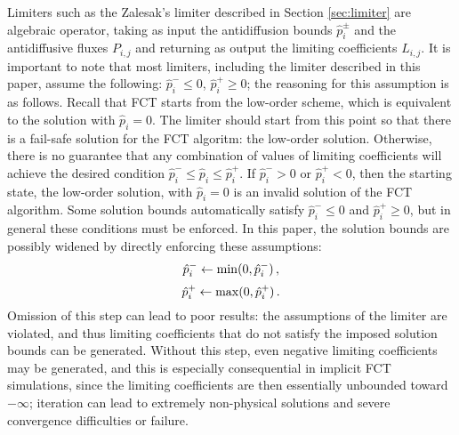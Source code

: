 Limiters such as the Zalesak's limiter described in Section \ref{sec:limiter} are algebraic
operator, taking as input the antidiffusion bounds
$\hat{p}_i^\pm$ and the antidiffusive fluxes $P_{i,j}$ and returning as output the
limiting coefficients $L_{i,j}$. It is important to note that most limiters,
including the limiter described in this paper, assume the following:
$\hat{p}_i^-\leq 0$, $\hat{p}_i^+\geq 0$; the reasoning for this assumption
is as follows. Recall that FCT starts from the
low-order scheme, which is equivalent to the solution with $\hat{p}_i=0$.
The limiter should start from this point so that there is a fail-safe solution
for the FCT algoritm: the low-order solution. Otherwise, there is no guarantee
that any combination of values of limiting coefficients will achieve
the desired condition $\hat{p}_i^-\leq \hat{p}_i\leq \hat{p}_i^+$. If
$\hat{p}_i^- > 0$ or $\hat{p}_i^+ < 0$, then the starting state, the low-order
solution, with $\hat{p}_i=0$ is an invalid solution of the FCT algorithm.
Some solution bounds automatically satisfy $\hat{p}_i^-\leq 0$ and $\hat{p}_i^+\geq 0$,
but in general these conditions must be enforced. In this paper, the solution
bounds are possibly widened by directly enforcing these assumptions:
\begin{equation}
  \hat{p}_i^- \gets \min(0,\hat{p}_i^-) \,,
\end{equation}
\begin{equation}
  \hat{p}_i^+ \gets \max(0,\hat{p}_i^+) \,.
\end{equation}
Omission of this step can lead to poor results: the assumptions of the
limiter are violated, and thus limiting coefficients that do not satisfy the
imposed solution bounds can be generated. Without this step, even negative limiting coefficients
may be generated, and this is especially consequential in implicit FCT
simulations, since the limiting coefficients are then essentially unbounded
toward $-\infty$; iteration can lead to extremely non-physical solutions
and severe convergence difficulties or failure. 


